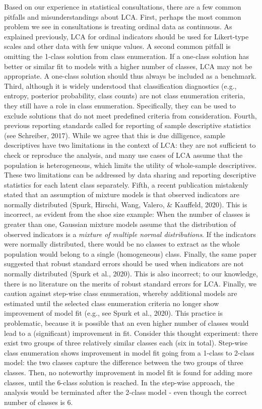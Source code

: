 \documentclass[
  ,man,floatsintext]{apa6}
\begin{document}
Based on our experience in statistical consultations,
there are a few common pitfalls and misunderstandings about LCA.
First, perhaps the most common problem we see in consultations is treating ordinal data as continuous.
As explained previously, LCA for ordinal indicators should be used for Likert-type scales and other data with few unique values.
A second common pitfall is omitting the 1-class solution from class enumeration.
If a one-class solution has better or similar fit to models with a higher number of classes, LCA may not be appropriate.
A one-class solution should thus always be included as a benchmark.
Third, although it is widely understood that classification diagnostics (e.g., entropy, posterior probability, class counts) are not class enumeration criteria,
they still have a role in class enumeration.
Specifically, they can be used to exclude solutions that do not meet predefined criteria from consideration.
Fourth, previous reporting standards called for reporting of sample descriptive statistics (see Schreiber, 2017).
While we agree that this is due dilligence,
sample descriptives have two limitations in the context of LCA:
they are not sufficient to check or reproduce the analysis,
and many use cases of LCA assume that the population is heterogeneous, which limits the utility of whole-sample descriptives.
These two limitations can be addressed by data sharing and reporting descriptive statistics for each latent class separately.
Fifth, a recent publication mistakenly stated that an assumption of mixture
models is that observed indicators are normally distributed
(Spurk, Hirschi, Wang, Valero, \& Kauffeld, 2020).
This is incorrect, as evident from the shoe size example:
When the number of classes is greater than one,
Gaussian mixture models assume that the distribution of observed indicators is a \emph{mixture of multiple normal distributions}.
If the indicators were normally distributed,
there would be no classes to extract as the whole population
would belong to a single (homogeneous) class.
Finally, the same paper suggested that robust standard errors
should be used when indicators are not normally distributed
(Spurk et al., 2020).
This is also incorrect;
to our knowledge, there is no literature on the merits of robust standard errors for LCA.
Finally, we caution against step-wise class enumeration,
whereby additional models are estimated until the selected class enumeration criteria no longer show improvement of model fit (e.g., see Spurk et al., 2020).
This practice is problematic,
because it is possible that an even higher number of classes would lead to a (significant) improvement in fit.
Consider this thought experiment: there exist two groups of three relatively similar classes each (six in total).
Step-wise class enumeration shows improvement in model fit going from a 1-class to 2-class model: the two classes capture the difference between the two groups of three classes.
Then, no noteworthy improvement in model fit is found for adding more classes, until the 6-class solution is reached.
In the step-wise approach, the analysis would be terminated after the 2-class model - even though the correct number of classes is 6.
\end{document}
